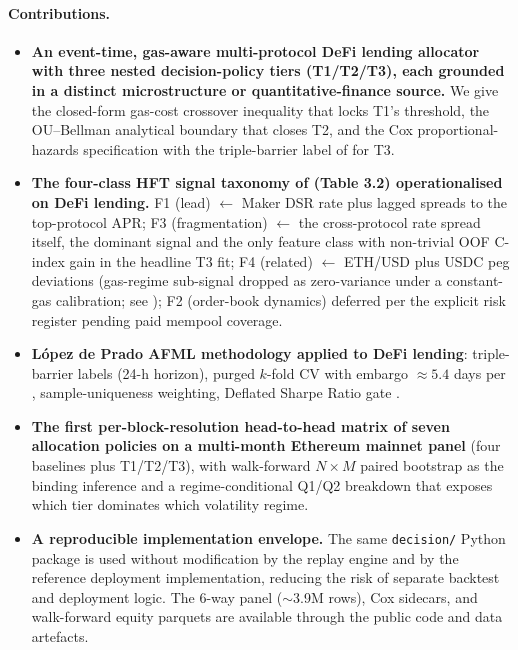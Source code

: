 \paragraph{Contributions.}
\begin{itemize}
  \item \textbf{An event-time, gas-aware multi-protocol DeFi
    lending allocator with three nested decision-policy tiers
    (T1/T2/T3), each grounded in a distinct microstructure or
    quantitative-finance source.}  We give the closed-form gas-cost
    crossover inequality that locks T1's threshold, the
    OU--Bellman analytical boundary that closes T2, and the Cox
    proportional-hazards specification with the triple-barrier
    label of \cite{lopezdeprado2018} for T3.

  \item \textbf{The four-class HFT signal taxonomy of
    \cite{mackenzie2021} (Table 3.2) operationalised on DeFi
    lending.}  F1 (lead) $\leftarrow$ Maker DSR rate plus lagged
    spreads to the top-protocol APR; F3 (fragmentation)
    $\leftarrow$ the cross-protocol rate spread itself, the
    dominant signal and the only feature class with non-trivial
    OOF C-index gain in the headline T3 fit; F4 (related)
    $\leftarrow$ ETH/USD plus USDC peg deviations
    (gas-regime sub-signal dropped as zero-variance under a
    constant-gas calibration; see );
    F2 (order-book dynamics) deferred per the explicit risk
    register pending paid mempool coverage.

  \item \textbf{L\'opez de Prado AFML methodology applied to DeFi
    lending}: triple-barrier labels (24-h horizon), purged $k$-fold
    CV with embargo $\approx 5.4$ days per
    \cite[Ch.\,7]{lopezdeprado2018}, sample-uniqueness weighting,
    Deflated Sharpe Ratio gate
    \cite[Ch.\,14.7.3]{lopezdeprado2018}.

  \item \textbf{The first per-block-resolution head-to-head matrix
    of seven allocation policies on a multi-month Ethereum mainnet
    panel} (four baselines plus T1/T2/T3), with walk-forward
    $N \!\times\! M$ paired bootstrap as the binding inference and
    a regime-conditional Q1/Q2 breakdown that exposes which tier
    dominates which volatility regime.

  \item \textbf{A reproducible implementation envelope.}  The same
    \texttt{decision/} Python package is used without modification
    by the replay engine and by the reference deployment
    implementation, reducing the risk of separate backtest and
    deployment logic.  The 6-way panel ($\sim$3.9M rows), Cox
    sidecars, and walk-forward equity parquets are available through
    the public code and data artefacts.
\end{itemize}

